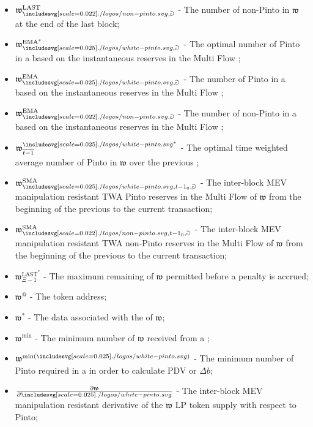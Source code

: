 \documentclass[class=article, crop=false]{standalone}
\begin{document}
\begin{itemize}[topsep=0pt, itemsep=3pt,leftmargin=16pt]
    \item[] $\mathfrak{w}_{\nonpinto,\Game}^{\text{LAST}}$ - The number of non-Pinto in $\mathfrak{w}$ at the end of the last block;
    \item[] $\mathfrak{w}_{\pinto,\Game}^{\text{EMA}^{*}}$ - The optimal number of Pinto in a  based on the instantaneous reserves in the Multi Flow ;
    \item[] $\mathfrak{w}_{\pinto,\Game}^{\text{EMA}}$ - The number of Pinto in a  based on the instantaneous reserves in the Multi Flow ;
    \item[] $\mathfrak{w}_{\nonpinto,\Game}^{\text{EMA}}$ - The number of non-Pinto in a  based on the instantaneous reserves in the Multi Flow ;
    \item[] $\mathfrak{w}_{\overline{t-1}}^{{\pinto}^{*}}$ - The optimal time weighted average number of Pinto in $\mathfrak{w}$ over the previous ;
    \item[] $\mathfrak{w}_{\pinto,{t-1}_0,\Game}^{\text{SMA}}$ - The inter-block MEV manipulation resistant TWA Pinto reserves in the Multi Flow  of $\mathfrak{w}$ from the beginning of the previous  to the current transaction;
    \item[] $\mathfrak{w}_{\nonpinto,{t-1}_0,\Game}^{\text{SMA}}$ - The inter-block MEV manipulation resistant TWA non-Pinto reserves in the Multi Flow  of $\mathfrak{w}$ from the beginning of the previous  to the current transaction;
    \item[] $\mathfrak{w}_{\Xi-1}^{\text{LAST}^{*}}$ - The maximum remaining  of $\mathfrak{w}$ permitted before a penalty is accrued;
    \item[] $\mathfrak{w}^{@}$ - The  token address;
    \item[] $\mathfrak{w}^{*}$ - The data associated with the  of $\mathfrak{w}$;
    \item[] $\mathfrak{w}^{\text{min}}$ - The minimum number of $\mathfrak{w}$ received from a ;
    \item[] $\mathfrak{w}^{\text{min}(\pinto)}$ - The minimum number of Pinto required in a  in order to calculate PDV or $\Delta b$;
    \item[] $\frac{\partial \mathfrak{w}}{\partial \pinto}$ - The inter-block MEV manipulation resistant derivative of the $\mathfrak{w}$ LP token supply with respect to Pinto;
\end{itemize}
\end{document}
